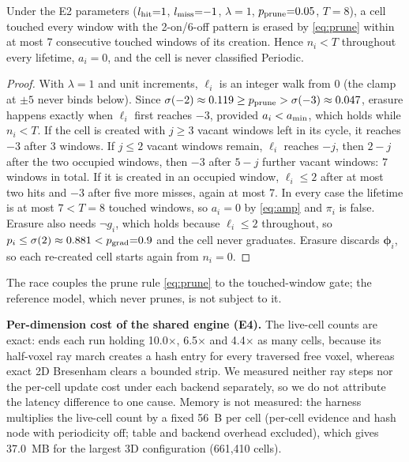 \begin{proposition}\label{prop:race}
Under the E2 parameters ($l_{\mathrm{hit}}{=}1$, $l_{\mathrm{miss}}{=}{-}1$, $\lambda{=}1$, $p_{\mathrm{prune}}{=}0.05$, $T{=}8$), a cell touched every window with the 2-on/6-off pattern is erased by \eqref{eq:prune} within at most 7 consecutive touched windows of its creation. Hence $n_i<T$ throughout every lifetime, $a_i=0$, and the cell is never classified Periodic.
\end{proposition}
\begin{proof}
With $\lambda{=}1$ and unit increments, $\ell_i$ is an integer walk from $0$ (the clamp at $\pm5$ never binds below). Since $\sigma(-2)\approx0.119\ge p_{\mathrm{prune}}>\sigma(-3)\approx0.047$, erasure happens exactly when $\ell_i$ first reaches $-3$, provided $a_i<a_{\min}$, which holds while $n_i<T$. If the cell is created with $j\ge3$ vacant windows left in its cycle, it reaches $-3$ after 3 windows. If $j\le2$ vacant windows remain, $\ell_i$ reaches $-j$, then $2-j$ after the two occupied windows, then $-3$ after $5-j$ further vacant windows: $7$ windows in total. If it is created in an occupied window, $\ell_i\le2$ after at most two hits and $-3$ after five more misses, again at most 7. In every case the lifetime is at most $7<T{=}8$ touched windows, so $a_i=0$ by \eqref{eq:amp} and $\pi_i$ is false. Erasure also needs $\lnot g_i$, which holds because $\ell_i\le2$ throughout, so $p_i\le\sigma(2)\approx0.881<p_{\mathrm{grad}}{=}0.9$ and the cell never graduates. Erasure discards $\boldsymbol{\phi}_i$, so each re-created cell starts again from $n_i=0$.
\end{proof}
The race couples the prune rule \eqref{eq:prune} to the touched-window gate; the reference model, which never prunes, is not subject to it.

\noindent\textbf{Per-dimension cost of the shared engine (E4).} \EfourResult{} The live-cell counts are exact:  ends each run holding 10.0$\times$, 6.5$\times$ and 4.4$\times$ as many cells, because its half-voxel ray march creates a hash entry for every traversed free voxel, whereas exact 2D Bresenham clears a bounded strip. We measured neither ray steps nor the per-cell update cost under each backend separately, so we do not attribute the latency difference to one cause. Memory is not measured: the harness multiplies the live-cell count by a fixed 56~B per cell (per-cell evidence and hash node with periodicity off; table and backend overhead excluded), which gives 37.0~MB for the largest 3D configuration (661,410 cells).

